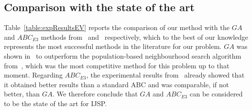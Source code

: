 \documentclass[icae]{iosart2x}
\newcommand{\reviewed}[1]{#1} %
\begin{document}
\begin{table}[tbh]
\small
\centering
\caption{\label{table:compareSA} \reviewed{Average $E[C_{max}]$ values obtained with different seasonality strategies for $ESABC$.}}
\end{table}


\subsection{Comparison with the state of the art}
Table~\ref{table:expResultsEV} reports the comparison of our method with the $GA$ and $ABC_{E3}$ methods from~\cite{Diaz2020genetic} and~\cite{Diaz2022} respectively, which to the best of our knowledge represents the most successful methods in the literature for our problem.  \reviewed{$GA$ was shown in~\cite{Diaz2020genetic} to outperform the population-based neighbourhood search algorithm from~\cite{Lei2011}, which was the most competitive method for this problem up to that moment. Regarding $ABC_{E3}$, the experimental results from~\cite{Diaz2022} already showed that it obtained better results than a standard ABC and was comparable, if not better, than $GA$.  We therefore conclude that $GA$ and $ABC_{E3}$ can be considered to be the state of the art for IJSP.}
\end{document}
